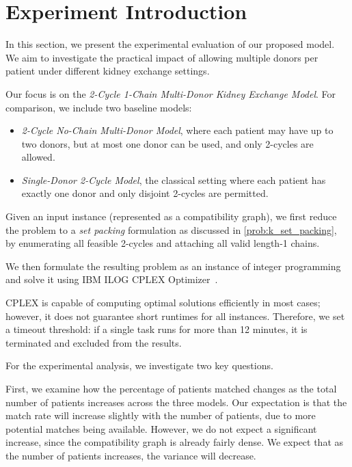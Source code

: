 \section{Experiment Introduction}

In this section, we present the experimental evaluation of our proposed model. We aim to investigate the practical impact of allowing multiple donors per patient under different kidney exchange settings.

Our focus is on the \textit{2-Cycle 1-Chain Multi-Donor Kidney Exchange Model}. For comparison, we include two baseline models:
\begin{itemize}
\item \textit{2-Cycle No-Chain Multi-Donor Model}, where each patient may have up to two donors, but at most one donor can be used, and only 2-cycles are allowed.
\item \textit{Single-Donor 2-Cycle Model}, the classical setting where each patient has exactly one donor and only disjoint 2-cycles are permitted.
\end{itemize}

Given an input instance (represented as a compatibility graph), we first reduce the problem to a \emph{set packing} formulation as discussed in \autoref{prob:k_set_packing}, by enumerating all feasible 2-cycles and attaching all valid length-1 chains.

We then formulate the resulting problem as an instance of integer programming and solve it using IBM ILOG CPLEX Optimizer~\cite{cplex}.

CPLEX is capable of computing optimal solutions efficiently in most cases; however, it does not guarantee short runtimes for all instances. Therefore, we set a timeout threshold: if a single task runs for more than 12 minutes, it is terminated and excluded from the results.


For the experimental analysis, we investigate two key questions.

First, we examine how the percentage of patients matched changes as the total number of patients increases across the three models. Our expectation is that the match rate will increase slightly with the number of patients, due to more potential matches being available. However, we do not expect a significant increase, since the compatibility graph is already fairly dense. We expect that as the number of patients increases, the variance will decrease.

